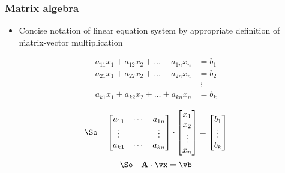 \begin{frame}
  \frametitle{Matrix algebra}

  \begin{itemize}
  \item Concise notation of linear equation system by appropriate definition
    of \h{matrix-vector multiplication}
  \end{itemize}
  \ungap
  \begin{align*}
    a_{11} x_1 + a_{12} x_2 + \dots + a_{1n} x_n &= b_1 \\
    a_{21} x_1 + a_{22} x_2 + \dots + a_{2n} x_n &= b_2 \\
    & \;\vdots \\
    a_{k1} x_1 + a_{k2} x_2 + \dots + a_{kn} x_n &= b_k \\
  \end{align*}
  \ungap[2]
  \[
  \text{\So} \quad
  \begin{bmatrix}
    a_{11} & \cdots & a_{1n} \\
    \vdots & & \vdots \\
    a_{k1} & \cdots & a_{kn}
  \end{bmatrix}
  \cdot
  \begin{bmatrix}
    x_1\\ x_2\\ \vdots\\ x_n
  \end{bmatrix}
  =
  \begin{bmatrix}
    b_1\\ \vdots\\ b_k
  \end{bmatrix}
  \]
  \pause
  \[
  \text{\So} \quad \mathbf{A} \cdot \vx = \vb
  \]
\end{frame}

